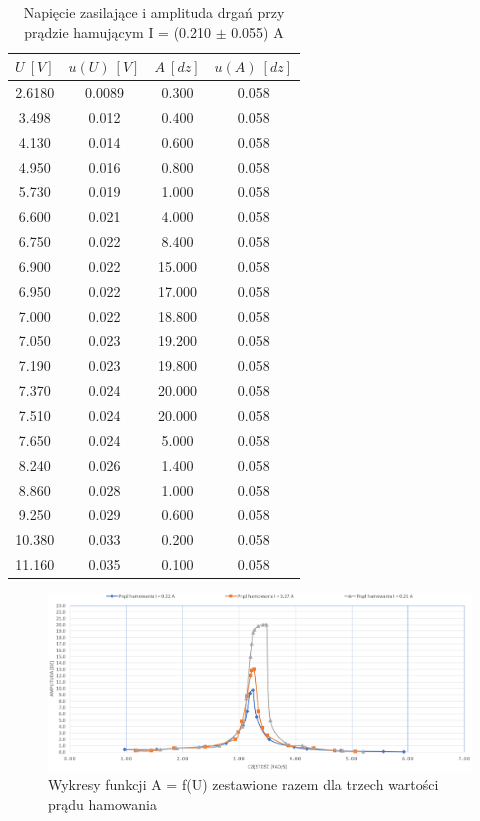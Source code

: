 \documentclass[12pt, a4paper, oneside]{article}
\begin{document}
\begin{table}[t]
  \centering
  \caption{Napięcie zasilające i amplituda drgań przy prądzie hamującym I = (0.210 $\pm$ 0.055) A}
    \begin{tabular}{|c|c|c|c|}\hline
    $U~[V]$ & $u(U)~[V]$ & $A~[dz]$ & $u(A)~[dz]$ \\\hline
    2.6180 & 0.0089 & 0.300 & 0.058 \\\hline
    3.498 & 0.012 & 0.400 & 0.058 \\\hline
    4.130 & 0.014 & 0.600 & 0.058 \\\hline
    4.950 & 0.016 & 0.800 & 0.058 \\\hline
    5.730 & 0.019 & 1.000 & 0.058 \\\hline
    6.600 & 0.021 & 4.000 & 0.058 \\\hline
    6.750 & 0.022 & 8.400 & 0.058 \\\hline
    6.900 & 0.022 & 15.000 & 0.058 \\\hline
    6.950 & 0.022 & 17.000 & 0.058 \\\hline
    7.000 & 0.022 & 18.800 & 0.058 \\\hline
    7.050 & 0.023 & 19.200 & 0.058 \\\hline
    7.190 & 0.023 & 19.800 & 0.058 \\\hline
    7.370 & 0.024 & 20.000 & 0.058 \\\hline
    7.510 & 0.024 & 20.000 & 0.058 \\\hline
    7.650 & 0.024 & 5.000 & 0.058 \\\hline
    8.240 & 0.026 & 1.400 & 0.058 \\\hline
    8.860 & 0.028 & 1.000 & 0.058 \\\hline
    9.250 & 0.029 & 0.600 & 0.058 \\\hline
    10.380 & 0.033 & 0.200 & 0.058 \\\hline
    11.160 & 0.035 & 0.100 & 0.058 \\\hline
    \end{tabular}%
  \label{tab:addlabel}%
\end{table}%
\clearpage
\begin{figure}[h]
\centering
\caption{Wykresy funkcji A = f(U) zestawione razem dla trzech wartości prądu hamowania}
\includegraphics[scale=0.35]{f8.png}
\end{figure}
\end{document}

